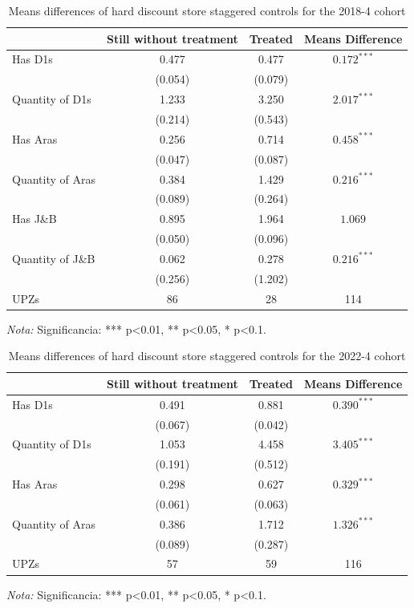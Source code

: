 \documentclass[12pt]{article}
\begin{document}
\begin{table} [H]
  \centering
  \caption{Means differences of hard discount store staggered controls for the 2018-4 cohort}
  \label{tab:staggered_controls_2018}
  \begin{tabular}{l c c c}
    \toprule
    & \textbf{Still without treatment} & \textbf{Treated} & \textbf{Means Difference} \\
    \midrule
    Has D1s & 0.477 & 0.477 & $0.172^{***}$ \\
    & (0.054) & (0.079) & \\
    \midrule
    Quantity of D1s & 1.233 & 3.250 & $2.017^{***}$ \\
    & (0.214) & (0.543) & \\
    \midrule
    Has Aras & 0.256 & 0.714 & $0.458^{***}$ \\
    & (0.047) & (0.087) & \\
    \midrule
    Quantity of Aras & 0.384 & 1.429 & $0.216^{***}$ \\
    & (0.089) & (0.264) & \\
    \midrule
    Has J\&B & 0.895 & 1.964 & $1.069$ \\
    & (0.050) & (0.096) & \\
    \midrule
    Quantity of J\&B & 0.062 & 0.278 & $0.216^{***}$ \\
    & (0.256) & (1.202) & \\
    \midrule
    UPZs & 86 & 28 & 114 \\
    \bottomrule
  \end{tabular}
  \parbox[t]{\textwidth}{%
    \vspace{0.5em}
    \footnotesize{ \textit{Nota:} Significancia: *** p<0.01, ** p<0.05, * p<0.1.}}
\end{table}


\begin{table} [H]
  \centering
  \caption{Means differences of hard discount store staggered controls for the 2022-4 cohort}
  \label{tab:staggered_controls_2022}
  \begin{tabular}{l c c c}
    \toprule
    & \textbf{Still without treatment} & \textbf{Treated} & \textbf{Means Difference} \\
    \midrule
    Has D1s & 0.491 & 0.881 & $0.390^{***}$ \\
    & (0.067) & (0.042) & \\
    \midrule
    Quantity of D1s & 1.053 & 4.458 & $3.405^{***}$ \\
    & (0.191) & (0.512) & \\
    \midrule
    Has Aras & 0.298 & 0.627 & $0.329^{***}$ \\
    & (0.061) & (0.063) & \\
    \midrule
    Quantity of Aras & 0.386 & 1.712 & $1.326^{***}$ \\
    & (0.089) & (0.287) & \\
    \midrule
    UPZs & 57 & 59 & 116 \\
    \bottomrule
  \end{tabular}
  \parbox[t]{\textwidth}{%
    \vspace{0.5em}
    \footnotesize{ \textit{Nota:} Significancia: *** p<0.01, ** p<0.05, * p<0.1.}}
\end{table}
\end{document}
